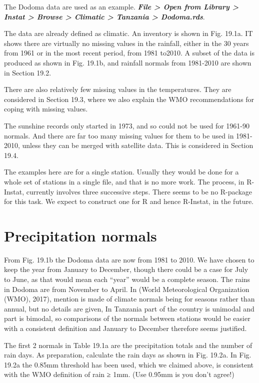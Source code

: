 \documentclass[
  letterpaper,
  DIV=11,
  numbers=noendperiod]{scrreprt}
\begin{document}
The Dodoma data are used as an example. \textbf{\emph{File
\textgreater{} Open from Library \textgreater{} Instat \textgreater{}
Browse \textgreater{} Climatic \textgreater{} Tanzania \textgreater{}
Dodoma.rds}}.

The data are already defined as climatic. An inventory is shown in Fig.
19.1a. IT shows there are virtually no missing values in the rainfall,
either in the 30 years from 1961 or in the most recent period, from 1981
to2010. A subset of the data is produced as shown in Fig. 19.1b, and
rainfall normals from 1981-2010 are shown in Section 19.2.

There are also relatively few missing values in the temperatures. They
are considered in Section 19.3, where we also explain the WMO
recommendations for coping with missing values.

The sunshine records only started in 1973, and so could not be used for
1961-90 normals. And there are far too many missing values for them to
be used in 1981-2010, unless they can be merged with satellite data.
This is considered in Section 19.4.

The examples here are for a single station. Usually they would be done
for a whole set of stations in a single file, and that is no more work.
The process, in R-Instat, currently involves three successive steps.
There seems to be no R-package for this task. We expect to construct one
for R and hence R-Instat, in the future.

\section{Precipitation normals}\label{precipitation-normals}

From Fig. 19.1b the Dodoma data are now from 1981 to 2010. We have
chosen to keep the year from January to December, though there could be
a case for July to June, as that would mean each ``year'' would be a
complete season. The rains in Dodoma are from November to April. In
(World Meteorological Organization (WMO), 2017), mention is made of
climate normals being for seasons rather than annual, but no details are
given, In Tanzania part of the country is unimodal and part is bimodal,
so comparisons of the normals between stations would be easier with a
consistent definition and January to December therefore seems justified.

The first 2 normals in Table 19.1a are the precipitation totals and the
number of rain days. As preparation, calculate the rain days as shown in
Fig. 19.2a. In Fig. 19.2a the 0.85mm threshold has been used, which we
claimed above, is consistent with the WMO definition of rain ≥ 1mm. (Use
0.95mm is you don't agree!)
\end{document}
